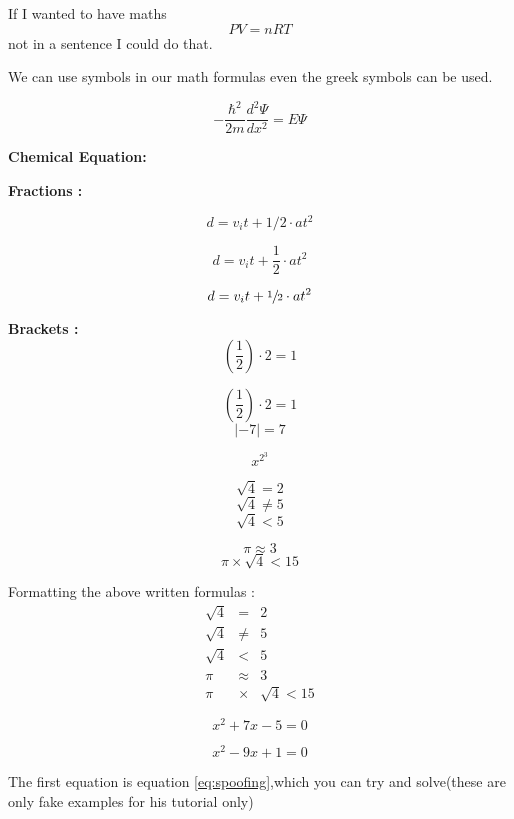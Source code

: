 \documentclass{article}
\begin{document}
If I wanted to have maths $$PV = nRT$$ not in a sentence I could do that.

We can use symbols in our math formulas even the greek symbols can be used.

$$-\frac{\hbar^2}{2m}\frac{d^2\Psi}{dx^2} = E\Psi$$  %

\bfseries {Chemical Equation}: 



\bfseries{Fractions} :

$$d = v_it + 1/2 \cdot at^2$$ %


$$d = v_it + \frac{1}{2} \cdot at^2$$ 

$$d = v_it + \sfrac{1}{2} \cdot at^2$$ 

\bfseries Brackets :
$$(\frac{1}{2}) \cdot 2 = 1$$ %

$$\left(   \frac{1}{2}   \right) \cdot 2 = 1$$
$$\left| -7 \right| = 7$$

$$x^{2^3}$$

$$\sqrt{4} = 2$$
$$\sqrt{4} \neq 5 $$ %
$$\sqrt{4} < 5$$

$$\pi \approx 3 $$
$$\pi \times \sqrt{4} < 15 $$

Formatting the above written formulas : 
\begin{eqnarray}
	\sqrt{4} &=& 2 \\ %
	\sqrt{4} &\neq& 5 \\ %
	\sqrt{4} &<& 5 \\
	\pi &\approx& 3 \\
	\pi &\times& \sqrt{4} < 15 %
\end{eqnarray}

\begin{equation} \label{eq:spoofing}
x^2 + 7x - 5 = 0
\end{equation}

\begin{equation} \label{eq:second}
x^2 - 9x +1 = 0
\end{equation}

The first equation is equation \ref{eq:spoofing},which you can try and solve(these are only fake examples for his tutorial only)
\end{document}
